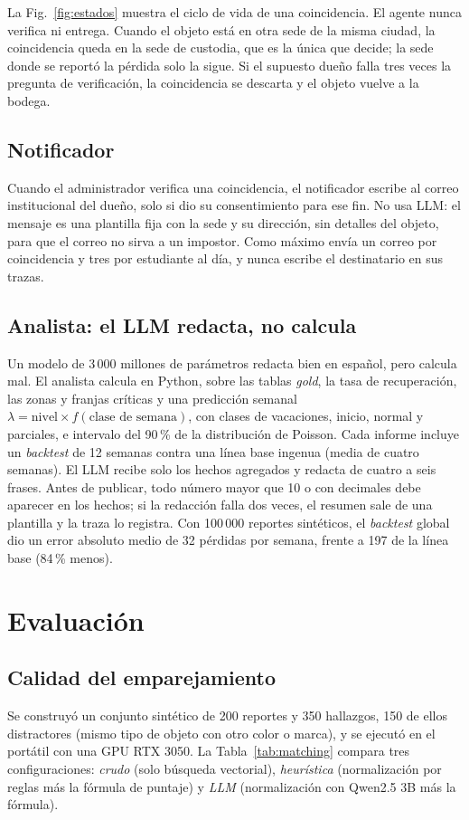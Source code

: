 \documentclass[conference]{IEEEtran}
\newcommand{\pc}{\,\%}
\begin{document}
La Fig.~\ref{fig:estados} muestra el ciclo de vida de una coincidencia. El agente nunca verifica ni entrega. Cuando el objeto está en otra sede de la misma ciudad, la coincidencia queda en la sede de custodia, que es la única que decide; la sede donde se reportó la pérdida solo la sigue. Si el supuesto dueño falla tres veces la pregunta de verificación, la coincidencia se descarta y el objeto vuelve a la bodega.

\subsection{Notificador}
Cuando el administrador verifica una coincidencia, el notificador escribe al correo institucional del dueño, solo si dio su consentimiento para ese fin. No usa LLM: el mensaje es una plantilla fija con la sede y su dirección, sin detalles del objeto, para que el correo no sirva a un impostor. Como máximo envía un correo por coincidencia y tres por estudiante al día, y nunca escribe el destinatario en sus trazas.

\subsection{Analista: el LLM redacta, no calcula}
Un modelo de 3\,000 millones de parámetros redacta bien en español, pero calcula mal. El analista calcula en Python, sobre las tablas \emph{gold}, la tasa de recuperación, las zonas y franjas críticas y una predicción semanal $\lambda = \text{nivel}\times f(\text{clase de semana})$, con clases de vacaciones, inicio, normal y parciales, e intervalo del 90\pc{} de la distribución de Poisson. Cada informe incluye un \emph{backtest} de 12 semanas contra una línea base ingenua (media de cuatro semanas). El LLM recibe solo los hechos agregados y redacta de cuatro a seis frases. Antes de publicar, todo número mayor que 10 o con decimales debe aparecer en los hechos; si la redacción falla dos veces, el resumen sale de una plantilla y la traza lo registra. Con 100\,000 reportes sintéticos, el \emph{backtest} global dio un error absoluto medio de 32 pérdidas por semana, frente a 197 de la línea base (84\pc{} menos).

\section{Evaluación}

\subsection{Calidad del emparejamiento}
Se construyó un conjunto sintético de 200 reportes y 350 hallazgos, 150 de ellos distractores (mismo tipo de objeto con otro color o marca), y se ejecutó en el portátil con una GPU RTX 3050. La Tabla~\ref{tab:matching} compara tres configuraciones: \emph{crudo} (solo búsqueda vectorial), \emph{heurística} (normalización por reglas más la fórmula de puntaje) y \emph{LLM} (normalización con Qwen2.5 3B más la fórmula).
\end{document}
